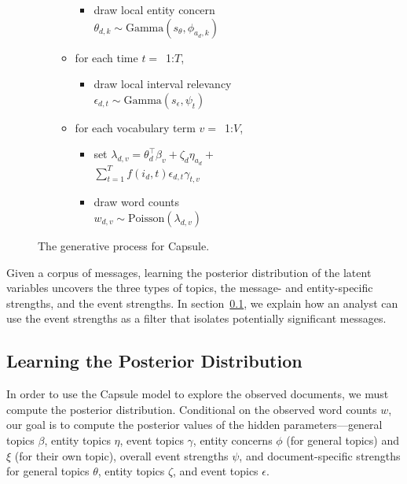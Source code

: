 \begin{figure}[!ht]
\begin{mdframed}[userdefinedwidth=3.0in,align=center]
\begin{itemize}[leftmargin=*]
\begin{itemize}[leftmargin=*]
\begin{itemize}[leftmargin=*]
			\item draw local entity concern \\$\theta_{d,k} \sim \mbox{Gamma}(s_\theta, \phi_{a_d,k})$
		\end{itemize}
	\item for each time $t=$~1:$T$,
		\begin{itemize}[leftmargin=*]
			\item draw local interval relevancy \\$\epsilon_{d,t} \sim \mbox{Gamma}(s_\epsilon, \psi_{t})$
		\end{itemize}
	\item for each vocabulary term $v=$~1:$V$,
		\begin{itemize}[leftmargin=*]
			\item set $\lambda_{d,v} = \theta_d^\top\beta_v  + \zeta_d \eta_{a_d} +$\\$ \sum_{t=1}^T f(i_d, t) \epsilon_{d,t} \gamma_{t,v}$
			\item draw word counts \\$w_{d,v} \sim \mbox{Poisson}\left(\lambda_{d,v}\right)$
		\end{itemize}
	\end{itemize}
\end{itemize}
\end{mdframed}
\caption{The generative process for Capsule.}
\label{fig:generative-model}
\end{figure}

Given a corpus of messages, learning the posterior distribution of the
latent variables uncovers the three types of topics, the message- and
entity-specific strengths, and the event strengths. In section~\ref{},
we explain how an analyst can use the event strengths as a filter that
isolates potentially significant messages.


\subsection{Learning the Posterior Distribution}


In order to use the Capsule model to explore the observed documents, we must compute the posterior distribution.  Conditional on the observed word counts $w$, our goal is to compute the posterior values of the hidden parameters---general topics $\beta$, entity topics $\eta$, event topics $\gamma$, entity concerns $\phi$ (for general topics) and $\xi$ (for their own topic), overall event strengths $\psi$, and document-specific strengths for general topics $\theta$, entity topics $\zeta$, and event topics $\epsilon$.

